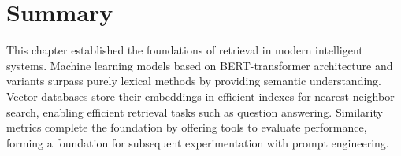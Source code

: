 \section{Summary}
This chapter established the foundations of retrieval in modern intelligent systems. Machine learning models based on \gls{BERT}-transformer \cite{bertpretrainingdeepbidirectional} architecture and variants surpass purely lexical methods by providing semantic understanding. Vector databases store their embeddings in efficient indexes for nearest neighbor search, enabling efficient retrieval tasks such as question answering. Similarity metrics complete the foundation by offering tools to evaluate performance, forming a foundation for subsequent experimentation with prompt engineering.









